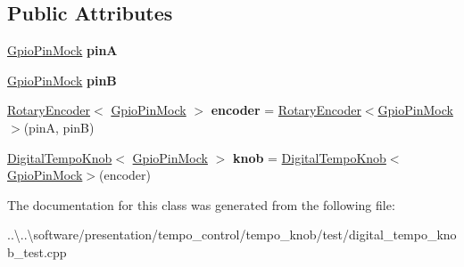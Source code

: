 \subsection*{Public Attributes}
\begin{DoxyCompactItemize}
\item 
\mbox{\label{class_digital_tempo_knob_test_a19d0db64dfb498356b8abb78c6992c80}} 
\mbox{\hyperlink{class_gpio_pin_mock}{Gpio\+Pin\+Mock}} {\bfseries pinA}
\item 
\mbox{\label{class_digital_tempo_knob_test_a22f3392dbcacb2b0ed639543776eba55}} 
\mbox{\hyperlink{class_gpio_pin_mock}{Gpio\+Pin\+Mock}} {\bfseries pinB}
\item 
\mbox{\label{class_digital_tempo_knob_test_ad7b5c9ecbdd01609c42686ee1a7545cf}} 
\mbox{\hyperlink{class_rotary_encoder}{Rotary\+Encoder}}$<$ \mbox{\hyperlink{class_gpio_pin_mock}{Gpio\+Pin\+Mock}} $>$ {\bfseries encoder} = \mbox{\hyperlink{class_rotary_encoder}{Rotary\+Encoder}}$<$\mbox{\hyperlink{class_gpio_pin_mock}{Gpio\+Pin\+Mock}}$>$(pinA, pinB)
\item 
\mbox{\label{class_digital_tempo_knob_test_a15b9dee201553e773b8490cf44b3b9f5}} 
\mbox{\hyperlink{class_digital_tempo_knob}{Digital\+Tempo\+Knob}}$<$ \mbox{\hyperlink{class_gpio_pin_mock}{Gpio\+Pin\+Mock}} $>$ {\bfseries knob} = \mbox{\hyperlink{class_digital_tempo_knob}{Digital\+Tempo\+Knob}}$<$\mbox{\hyperlink{class_gpio_pin_mock}{Gpio\+Pin\+Mock}}$>$(encoder)
\end{DoxyCompactItemize}


The documentation for this class was generated from the following file\+:\begin{DoxyCompactItemize}
\item 
..\textbackslash{}..\textbackslash{}software/presentation/tempo\+\_\+control/tempo\+\_\+knob/test/digital\+\_\+tempo\+\_\+knob\+\_\+test.\+cpp\end{DoxyCompactItemize}
